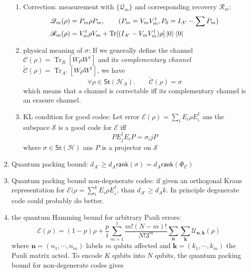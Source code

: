 \documentclass[11pt,a4paper]{article}%
\numberwithin{equation}{section}
\renewcommand*{\vec}[1]{\bm{#1}}%
\newcommand{\Tr}{\operatorname{Tr}}
\newcommand{\St}{{\mathsf{St}}}
\newcommand{\rank}{{\mathsf{rank}}}
\begin{document}
\begin{enumerate}
\begin{enumerate}
        \item Correction: measurement with $\{\mathscr Q_m\}$ and corresponding recovery $\mathscr R_m$:
        \begin{align}
            \mathscr Q_m(\rho) &= P_m\rho P_m, \qquad (P_m = V_m V_m^\dagger, P_0 = I_{A'} - \sum P_m )\\
            \mathscr R_m(\rho) &= V_m^\dagger \rho V_m + \Tr[(I_{A'} - V_mV_m^\dagger)\rho]\ket0\bra0
        \end{align}
        \item physical meaning of $\sigma$: If we generally define the channel $\mathscr C(\rho) = \Tr_B[W\rho W^\dagger]$ and its \emph{complementary channel} $\tilde{\mathscr C}(\rho) = \Tr_{A'}[W\rho W^\dagger]$, we have
        \begin{equation}
            \forall \rho\in\St(\mathcal H_A).\qquad \tilde{\mathscr C}(\rho) = \sigma
        \end{equation}
        which means that a channel is correctable iff its complementary channel is an erasure channel.
        \item KL condition for good codes: Let error $\mathscr E(\rho) = \sum_i E_i\rho E_i^\dagger$ ans the subspace $\mathcal S$ is a good code for $\mathscr E$ iff
        \begin{equation}
            PE_j^\dagger E_i P = \sigma_ij P
        \end{equation}
        where $\sigma\in\St(\mathcal H)$ ans $P$ is a projector on $\mathcal S$
    \end{enumerate}
    \item Quantum packing bound: $d_{A'}\ge d_A\rank(\sigma) =d_A\rank(\Phi_{\mathscr C})$
    \item Quantum packing bound non-degenerate codes: if given an orthogonal Kraus representation for $\mathscr E(\rho = \sum_i^k E_i\rho E_i^\dagger$, than $d_{A'}\ge d_Ak$. In principle degenerate code could probably do better.
    \item the quantum Hamming bound for arbitrary Pauli errors:
    \begin{equation}
        \mathscr E(\rho) =(1-p)\rho + \frac pt\sum_{m=1}^t\frac {m!(N-m)!}{N!3^m}\sum_{\vec n}\sum_{\vec k}\mathscr U_{\vec n,\vec k}(\rho)
    \end{equation}
    where $\vec n = (n_1,\cdots,n_m)$ labels $m$ qubits affected and $\vec k = (k_1,\cdots, k_m)$ the Pauli matrix acted. To encode $K$ qubits into $N$ qubits, the quantum packing bound for non-degenerate codes gives
    \begin{equation}

\end{equation}
\end{enumerate}
\end{document}
